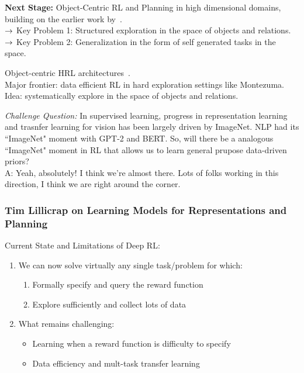 {\bf Next Stage:} Object-Centric RL and Planning in high dimensional domains, building on the earlier work by~\citet{diuk2008object}. \\

$\rightarrow$ Key Problem 1: Structured exploration in the space of objects and relations. \\

$\rightarrow$ Key Problem 2: Generalization in the form of self generated tasks in the space.

Object-centric HRL architectures~\cite{kulkarni2016hierarchical,dilokthanakul2019feature}. \\

Major frontier: data efficient RL in hard exploration settings like Montezuma. Idea: systematically explore in the space of objects and relations.

{\it Challenge Question:} In supervised learning, progress in representation learning and trasnfer learning for vision has been largely driven by ImageNet. NLP had its ``ImageNet" moment with GPT-2 and BERT. So, will there be a analogous ``ImageNet" moment in RL that allows us to learn general prupose data-driven priors? \\

A: Yeah, absolutely! I think we're almost there. Lots of folks working in this direction, I think we are right around the corner. 


\subsubsection{Tim Lillicrap on Learning Models for Representations and Planning}

Current State and Limitations of Deep RL:
\begin{enumerate}
    \item We can now solve virtually any single task/problem for which:
    \begin{enumerate}
        \item Formally specify and query the reward function
        \item Explore sufficiently and collect lots of data
    \end{enumerate}
    \item What remains challenging:
    \begin{itemize}
        \item Learning when a reward function is difficulty to specify
        \item Data efficiency and mult-task transfer learning
    \end{itemize}
\end{enumerate}

